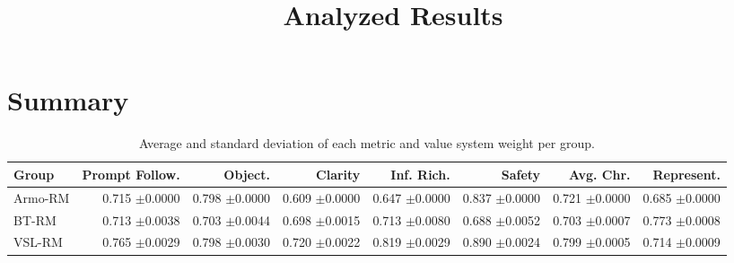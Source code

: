 \documentclass{article}
\begin{document}
\title{Analyzed Results}

\date{}

\maketitle

\section*{Summary}

\begin{table}[p]
\centering
\small
\caption{Average and standard deviation of each metric and value system weight per group.}
\label{tab:group-summary}
\begin{tabular}{lrrrrrrr}
\toprule
Group & Prompt Follow. & Object. & Clarity & Inf. Rich. & Safety & Avg. Chr. & Represent. \\
\midrule
Armo-RM & \makecell[r]{0.715 \\ $\pm$0.0000} & \makecell[r]{0.798 \\ $\pm$0.0000} & \makecell[r]{0.609 \\ $\pm$0.0000} & \makecell[r]{0.647 \\ $\pm$0.0000} & \makecell[r]{0.837 \\ $\pm$0.0000} & \makecell[r]{0.721 \\ $\pm$0.0000} & \makecell[r]{0.685 \\ $\pm$0.0000} \\
BT-RM & \makecell[r]{0.713 \\ $\pm$0.0038} & \makecell[r]{0.703 \\ $\pm$0.0044} & \makecell[r]{0.698 \\ $\pm$0.0015} & \makecell[r]{0.713 \\ $\pm$0.0080} & \makecell[r]{0.688 \\ $\pm$0.0052} & \makecell[r]{0.703 \\ $\pm$0.0007} & \makecell[r]{0.773 \\ $\pm$0.0008} \\
VSL-RM & \makecell[r]{0.765 \\ $\pm$0.0029} & \makecell[r]{0.798 \\ $\pm$0.0030} & \makecell[r]{0.720 \\ $\pm$0.0022} & \makecell[r]{0.819 \\ $\pm$0.0029} & \makecell[r]{0.890 \\ $\pm$0.0024} & \makecell[r]{0.799 \\ $\pm$0.0005} & \makecell[r]{0.714 \\ $\pm$0.0009} \\

\end{tabular}
\end{table}
\end{document}
